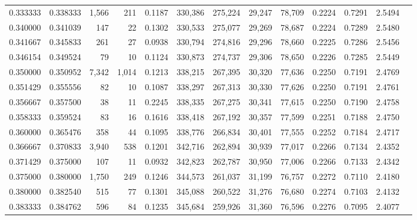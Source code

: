 \begin{tabular}{rrrrrrrrrrrrr}
0.333333 & 0.338333 &  1,566 &    211 &                                     0.1187 & 330,386 & 275,224 &  29,247 &  78,709 & 0.2224 & 0.7291 & 2.5494 \\
0.340000 & 0.341039 &    147 &     22 &                                     0.1302 & 330,533 & 275,077 &  29,269 &  78,687 & 0.2224 & 0.7289 & 2.5480 \\
0.341667 & 0.345833 &    261 &     27 &                                     0.0938 & 330,794 & 274,816 &  29,296 &  78,660 & 0.2225 & 0.7286 & 2.5456 \\
0.346154 & 0.349524 &     79 &     10 &                                     0.1124 & 330,873 & 274,737 &  29,306 &  78,650 & 0.2226 & 0.7285 & 2.5449 \\
0.350000 & 0.350952 &  7,342 &  1,014 &                                     0.1213 & 338,215 & 267,395 &  30,320 &  77,636 & 0.2250 & 0.7191 & 2.4769 \\
0.351429 & 0.355556 &     82 &     10 &                                     0.1087 & 338,297 & 267,313 &  30,330 &  77,626 & 0.2250 & 0.7191 & 2.4761 \\
0.356667 & 0.357500 &     38 &     11 &                                     0.2245 & 338,335 & 267,275 &  30,341 &  77,615 & 0.2250 & 0.7190 & 2.4758 \\
0.358333 & 0.359524 &     83 &     16 &                                     0.1616 & 338,418 & 267,192 &  30,357 &  77,599 & 0.2251 & 0.7188 & 2.4750 \\
0.360000 & 0.365476 &    358 &     44 &                                     0.1095 & 338,776 & 266,834 &  30,401 &  77,555 & 0.2252 & 0.7184 & 2.4717 \\
0.366667 & 0.370833 &  3,940 &    538 &                                     0.1201 & 342,716 & 262,894 &  30,939 &  77,017 & 0.2266 & 0.7134 & 2.4352 \\
0.371429 & 0.375000 &    107 &     11 &                                     0.0932 & 342,823 & 262,787 &  30,950 &  77,006 & 0.2266 & 0.7133 & 2.4342 \\
0.375000 & 0.380000 &  1,750 &    249 &                                     0.1246 & 344,573 & 261,037 &  31,199 &  76,757 & 0.2272 & 0.7110 & 2.4180 \\
0.380000 & 0.382540 &    515 &     77 &                                     0.1301 & 345,088 & 260,522 &  31,276 &  76,680 & 0.2274 & 0.7103 & 2.4132 \\
0.383333 & 0.384762 &    596 &     84 &                                     0.1235 & 345,684 & 259,926 &  31,360 &  76,596 & 0.2276 & 0.7095 & 2.4077 \\

\end{tabular}
